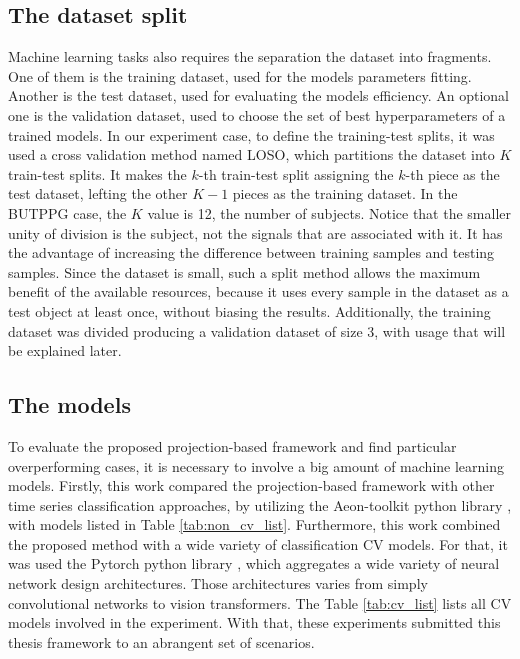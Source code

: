\subsection{The dataset split}

Machine learning tasks also requires the separation the dataset into fragments. One of them is the training dataset, used for the models parameters fitting. Another is the test dataset, used for evaluating the models efficiency. An optional one is the validation dataset, used to choose the set of best hyperparameters of a trained models. In our experiment case, to define the training-test splits, it was used a cross validation method named \gls{LOSO}, which partitions the dataset into $K$ train-test splits. It makes the $k$-th train-test split assigning the $k$-th piece as the test dataset, lefting the other $K-1$ pieces as the training dataset. In the \gls{BUTPPG} case, the $K$ value is 12, the number of subjects. Notice that the smaller unity of division is the subject, not the signals that are associated with it. It has the advantage of increasing the difference between training samples and testing samples. Since the dataset is small, such a split method allows the maximum benefit of the available resources, because it uses every sample in the dataset as a test object at least once, without biasing the results. Additionally, the training dataset was divided producing a validation dataset of size 3, with usage that will be explained later.

\subsection{The models}

To evaluate the proposed projection-based framework and find particular overperforming cases, it is necessary to involve a big amount of machine learning models. Firstly, this work compared the projection-based framework with other time series classification approaches, by utilizing the Aeon-toolkit python library \cite{AeonDoc}, with models listed in Table \ref{tab:non_cv_list}. Furthermore, this work combined the proposed method with a wide variety of classification \gls{CV} models. For that, it was used the Pytorch python library \cite{PytorchDoc}, which aggregates a wide variety of neural network design architectures. Those architectures varies from simply convolutional networks to vision transformers. The Table \ref{tab:cv_list} lists all \gls{CV} models involved in the experiment. With that, these experiments submitted this thesis framework to an abrangent set of scenarios.

